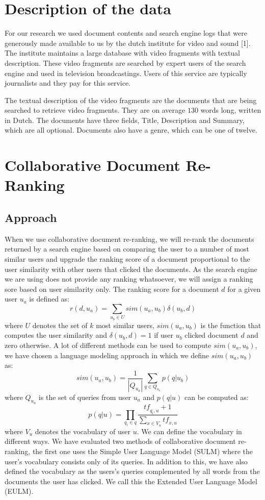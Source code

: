 \documentclass[12pt]{amsart}
\begin{document}
\section{Description of the data}
For our research we used document contents and search engine logs that were generously made available to us by the dutch institute for video and sound [1]. The institute maintains a large database with video fragments with textual description. These video fragments are searched by expert users of the search engine and used in television broadcastings. Users of this service are typically journalists and they pay for this service.

The textual description of the video fragments are the documents that are being searched to retrieve video fragments. They are on average $130$ words long, written in Dutch. The documents have three fields, Title, Description and Summary, which are all optional. Documents also have a genre, which can be one of twelve. 

\section{Collaborative Document Re-Ranking}
\subsection{Approach}
When we use collaborative document re-ranking, we will re-rank the documents returned by a search engine based on comparing the user to a number of most similar users and upgrade the ranking score of a document proportional to the user similarity with other users that clicked the documents. As the search engine we are using does not provide any ranking whatsoever, we will assign a ranking sore based on user similarity only. The ranking score for a document $d$ for a given user $u_a$ is defined as: 
$$r(d, u_a) = \sum\limits_{u_b \in U}\textit{sim}(u_a, u_b)\delta(u_b, d)$$
where $U$ denotes the set of $k$ most similar users, $\textit{sim}(u_a, u_b)$ is the function that computes the user similarity and $\delta(u_b, d) = 1$ if user $u_b$ clicked document $d$ and zero otherwise. A lot of different methods can be used to compute $\textit{sim}(u_a, u_b)$, we have chosen a language modeling approach in which we define $\textit{sim}(u_a, u_b)$ as:
$$ \textit{sim}(u_a, u_b) = \frac{1}{|Q_{u_a}|}\sum\limits_{q \in Q_{u_a}} p(q|u_b)$$
where $Q_{u_a}$ is the set of queries from user $u_a$ and $p(q|u)$ can be computed as:
$$p(q|u) = \prod\limits_{q_i \in q} \frac{\textit{tf}_{q_i, u}+1}{\sum\limits_{x \in V_u} \textit{tf}_{x, u}}$$
where $V_u$ denotes the vocabulary of user $u$. We can define the vocabulary in different ways. We have evaluated two methods of collaborative document re-ranking, the first one uses the Simple User Language Model (SULM) where the user's vocabulary consists only of its queries. In addition to this, we have also defined the vocabulary as the users's queries complemented by all words from the documents the user has clicked. We call this the Extended User Language Model (EULM).
\end{document}
